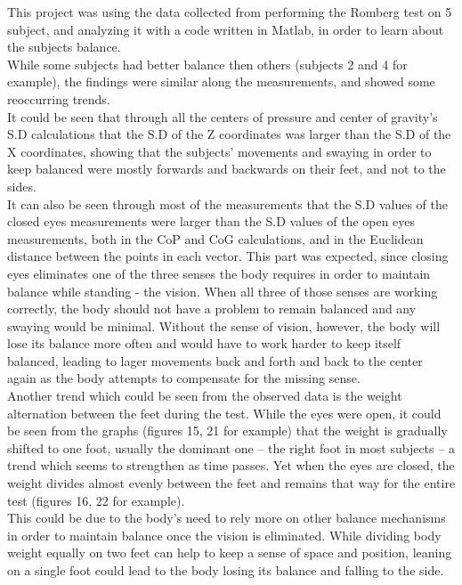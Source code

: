 \documentclass[twoside]{ctuthesis}
\theoremstyle{plain}
\theoremstyle{definition}
\theoremstyle{note}
\begin{document}
This project was using the data collected from performing the Romberg test on 5 subject, and analyzing it with a code written in Matlab, in order to learn about the subjects balance.\\
While some subjects had better balance then others (subjects 2 and 4 for example), the findings were similar along the measurements, and showed some reoccurring trends.\\
It could be seen that through all the centers of pressure and center of gravity's S.D calculations that the S.D of the Z coordinates was larger than the S.D of the X coordinates, showing that the subjects' movements and swaying in order to keep balanced were mostly forwards and backwards on their feet, and not to the sides.\\
It can also be seen through most of the measurements that the S.D values of the closed eyes measurements were larger than the S.D values of the open eyes measurements, both in the CoP and CoG calculations, and in the Euclidean distance between the points in each vector. This part was expected, since closing eyes eliminates one of the three senses the body requires in order to maintain balance while standing - the vision\cite{Physio}. When all three of those senses are working correctly, the body should not have a problem to remain balanced and any swaying would be minimal. Without the sense of vision, however, the body will lose its balance more often and would have to work harder to keep itself balanced, leading to lager movements back and forth and back to the center again as the body attempts to compensate for the missing sense.\\
Another trend which could be seen from the observed data is the weight alternation between the feet during the test. While the eyes were open, it could be seen from the graphs (figures 15, 21 for example) that the weight is gradually shifted to one foot, usually the dominant one – the right foot in most subjects – a trend which seems to strengthen as time passes. Yet when the eyes are closed, the weight divides almost evenly between the feet and remains that way for the entire test (figures 16, 22 for example).\\
This could be due to the body's need to rely more on other balance mechanisms in order to maintain balance once the vision is eliminated. While dividing body weight equally on two feet can help to keep a sense of space and position, leaning on a single foot could lead to the body losing its balance and falling to the side.\\
\end{document}
